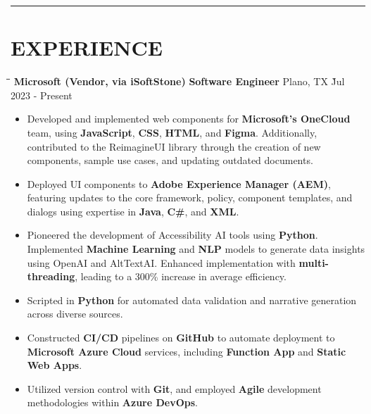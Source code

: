 \documentclass{res}
\begin{document}
\begin{resume}
\vspace{-8pt}
\hspace{-0.55in}
\noindent\rule[0.25\baselineskip]{19.36cm}{0.5pt}    

\vspace{-0.2in}
\section{EXPERIENCE}
    \vspace{0.00in}	
    \begin{tabbing}
    \hspace{3.1in}\= \hspace{1.6in}\= \hspace{1.2in}\= \kill %
    {\bf Microsoft (Vendor, via iSoftStone)} \> {\bf Software Engineer}  \>  
                                    Plano, TX    \` Jul 2023 - Present\\
    \end{tabbing}\vspace{-20pt}      %
    \vspace{+0.1in}
    \begin{itemize} \itemsep 1.5pt %
    \item Developed and implemented web components for {\bf Microsoft's OneCloud} team, using {\bf JavaScript}, 
        {\bf CSS}, {\bf HTML}, and {\bf Figma}. Additionally, contributed to the ReimagineUI library 
        through the creation of new components, sample use cases, and updating outdated documents.
    \item Deployed UI components to {\bf Adobe Experience Manager (AEM)}, featuring updates to the core framework, 
        policy, component templates, and dialogs using expertise in {\bf Java}, {\bf C\#}, and {\bf XML}.
    \item Pioneered the development of Accessibility AI tools using {\bf Python}. 
        Implemented {\bf Machine Learning} and {\bf NLP} models to generate data insights using OpenAI and AltTextAI.
        Enhanced implementation with {\bf multi-threading}, leading to a 300\% increase in average efficiency.
    \item Scripted in {\bf Python} for automated data validation and narrative generation across diverse sources.
    \item Constructed {\bf CI/CD} pipelines on {\bf GitHub} to automate deployment to 
        {\bf Microsoft Azure Cloud} services, including {\bf Function App} and {\bf Static Web Apps}.
    \item Utilized version control with {\bf Git}, and employed {\bf Agile} 
        development methodologies within {\bf Azure DevOps}.
    \end{itemize}



\end{resume}
\end{document}
